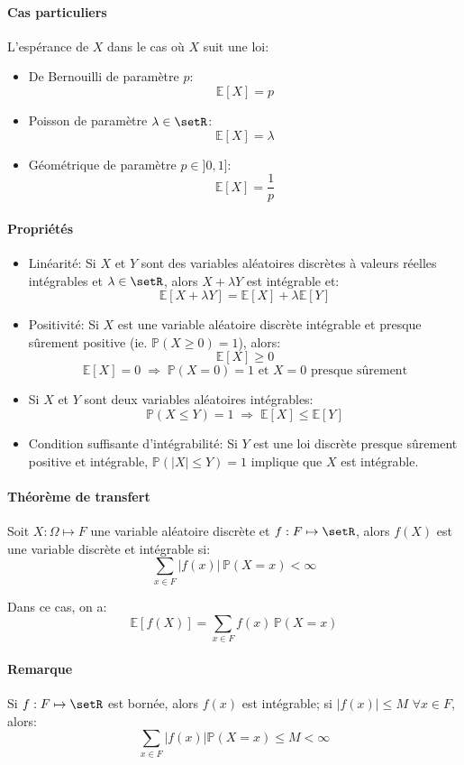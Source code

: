 \documentclass[a4paper,10pt,french,openany]{memoir}
\newcommand{\Proba}{\mathbb{P}}
\newcommand{\Esper}{\mathbb{E}}
\newcommand{\abs}[1]{\lvert #1 \rvert}
\begin{document}
\paragraph{Cas particuliers}
L'espérance de $X$ dans le cas où $X$ suit une loi:
\begin{itemize}
 \item De Bernouilli de paramètre $p$: \[ \Esper[X]=p \]
 \item Poisson de paramètre $\lambda \in \setR$: \[\Esper[X]=\lambda\]
 \item Géométrique de paramètre $p\in ]0,1]$: \[ \Esper[X]=\frac 1 p \]
\end{itemize}

\paragraph{Propriétés}
\begin{itemize}
 \item Linéarité: Si $X$ et $Y$ sont des variables aléatoires discrètes à valeurs réelles intégrables et $\lambda \in \setR$, alors $X + \lambda Y$ est intégrable et: \[\Esper[X+\lambda Y] = \Esper[X] + \lambda\Esper[Y]\]
 \item Positivité: Si $X$ est une variable aléatoire discrète intégrable et presque sûrement positive (ie. $\Proba(X \geq 0) = 1$), alors: \[\Esper[X] \geq 0 \] \[\Esper[X] = 0 \;\Rightarrow\; \Proba(X=0)=1 \text{ et } X=0 \text{ presque sûrement}\]
 \item Si $X$ et $Y$ sont deux variables aléatoires intégrables: \[\Proba(X \leq Y) = 1 \;\Rightarrow\; \Esper[X]\leq\Esper[Y]\]
 \item Condition suffisante d'intégrabilité: Si $Y$ est une loi discrète presque sûrement positive et intégrable, $\Proba(\abs{X}\leq Y) = 1$ implique que $X$ est intégrable.
\end{itemize}

\paragraph{Théorème de transfert}
Soit $X:\Omega \mapsto F$ une variable aléatoire discrète et $f:F \mapsto \setR$, alors $f(X)$ est une variable discrète et intégrable si: \[\sum_{x\in F} \abs{f(x)} \,\Proba(X=x) < \infty\]

Dans ce cas, on a: \[\Esper[f(X)] = \sum_{x\in F} f(x) \,\Proba(X=x)\]

\paragraph{Remarque}
Si $f: F\mapsto\setR$ est bornée, alors $f(x)$ est intégrable; si $\abs{f(x)} \leq M$ $\forall x \in F$, alors: \[\sum_{x\in F} \abs{f(x)} \Proba(X=x) \leq M < \infty\]
\end{document}
